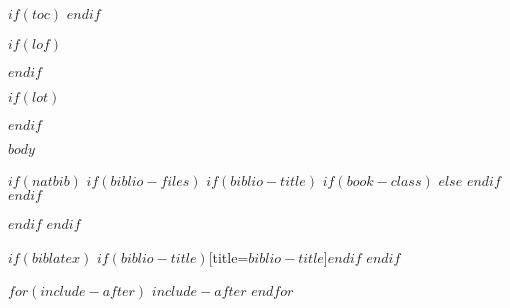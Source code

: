 \documentclass[$if(fontsize)$$fontsize$,$endif$$if(lang)$$lang$,$endif$$if(papersize)$$papersize$,$endif$$for(classoption)$$classoption$$sep$,$endfor$]{$documentclass$}
\begin{document}
  $if(toc)$
    {
    \hypersetup{linkcolor=$linkcolor$}
    \setcounter{tocdepth}{$toc-depth$}
    \tableofcontents
    }
  $endif$

  $if(lof)$
    \listoffigures
  $endif$

  $if(lot)$
    \listoftables
  $endif$

  \newpage

  \setcounter{page}{1}
  $body$

  $if(natbib)$
    $if(biblio-files)$
      $if(biblio-title)$
        $if(book-class)$
          \renewcommand\bibname{$biblio-title$}
        $else$
          \renewcommand\refname{$biblio-title$}
        $endif$
      $endif$

      
    $endif$
  $endif$

  $if(biblatex)$
    \printbibliography$if(biblio-title)$[title=$biblio-title$]$endif$
  $endif$

  $for(include-after)$
    $include-after$
  $endfor$
\end{document}
